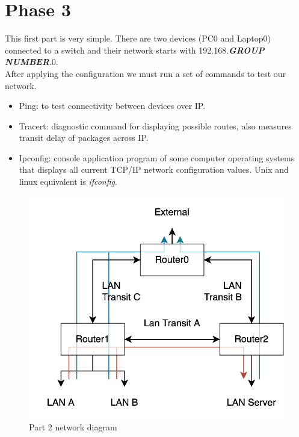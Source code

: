 \documentclass[11pt,a4paper]{report}
\begin{document}
\chapter{Phase 3}
    This first part is very simple. There are two devices (PC0 and Laptop0) connected to a switch and their network starts with 192.168.\textbf{\textit{GROUP NUMBER}}.0.\\
    After applying the configuration we must run a set of commands to test our network.
    \begin{itemize}
        \item Ping: to test connectivity between devices over IP.
        \item Tracert: diagnostic command for displaying possible routes, also measures transit delay of packages across IP.
        \item Ipconfig: console application program of some computer operating systems that displays all current TCP/IP network configuration values. Unix and linux equivalent is \textit{ifconfig}.
    \end{itemize}

    \begin{figure}[h]
        \centering
        \includegraphics[scale=0.40,valign=c]{diagramL250}
        \caption{Part 2 network diagram}
        \label{fig:p2netdiag}
    \end{figure}
    
\end{document}
